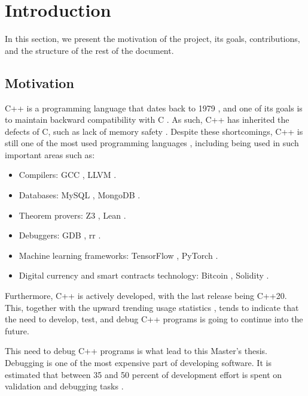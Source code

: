 \chapter{Introduction}
\label{cap:introduction}



In this section, we present the motivation of the project, its goals, contributions, and the structure of the rest of the document.

\section{Motivation}
C++ is a programming language that dates back to 1979 \cite{cppHistory}, and one of its goals is to maintain backward compatibility with C \cite{cCompat}. As such, C++ has inherited the defects of C, such as lack of memory safety \cite{practicalmemorysafety}.
Despite these shortcomings, C++ is still one of the most used programming languages \cite{popularityPL}, including being used in such important areas such as:
\begin{itemize}
    \item Compilers: GCC \cite{gcc}, LLVM \cite{llvm}.
    \item Databases: MySQL \cite{mysql}, MongoDB \cite{mongodb}.
    \item Theorem provers: Z3 \cite{z3}, Lean \cite{lean}.
    \item Debuggers: GDB \cite{gdb}, rr \cite{rr}.
    \item Machine learning frameworks: TensorFlow \cite{tensorflow}, PyTorch \cite{pytorch}.
    \item Digital currency and smart contracts technology: Bitcoin \cite{bitcoin}, Solidity \cite{solidity}.
\end{itemize}

Furthermore, C++ is actively developed, with the last release being C++20. This, together with the upward trending usage statistics \cite{popularityPL}, tends to indicate that the need to develop, test, and debug C++ programs is going to continue into the future.

This need to debug C++ programs is what lead to this Master's thesis.
Debugging is one of the most expensive part of developing software.
It is estimated that between 35 and 50 percent of development effort is spent on validation and debugging tasks \cite{debuggingMindset}.

